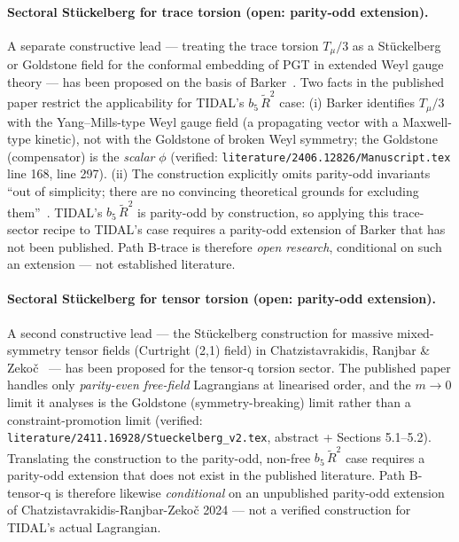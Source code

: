 \paragraph{Sectoral Stückelberg for trace torsion (open: parity-odd extension).}
A separate constructive lead --- treating the trace torsion
$T_\mu/3$ as a Stückelberg or Goldstone field for the conformal embedding
of PGT in extended Weyl gauge theory --- has been proposed on the basis
of Barker~\cite{barker2024poincare}.  Two facts in the published paper
restrict the applicability for TIDAL's $b_5\,\tilde{R}^2$ case:
(i) Barker identifies $T_\mu/3$ with the Yang--Mills-type Weyl gauge
field (a propagating vector with a Maxwell-type kinetic), not with the
Goldstone of broken Weyl symmetry; the Goldstone (compensator) is the
\emph{scalar} $\phi$ (verified: \texttt{literature/2406.12826/Manuscript.tex}
line 168, line 297).  (ii) The construction explicitly omits parity-odd
invariants ``out of simplicity; there are no convincing theoretical
grounds for excluding them''~\cite[footnote at line 109]{barker2024poincare}.
TIDAL's $b_5\,\tilde{R}^2$ is parity-odd by construction, so applying
this trace-sector recipe to TIDAL's case requires a parity-odd extension
of Barker that has not been published.  Path B-trace is therefore
\emph{open research}, conditional on such an extension --- not
established literature.

\paragraph{Sectoral Stückelberg for tensor torsion (open: parity-odd extension).}
A second constructive lead --- the Stückelberg construction for massive
mixed-symmetry tensor fields (Curtright (2,1) field) in
Chatzistavrakidis, Ranjbar \& Zekoč~\cite{ChatzistavrakidisRanjbarZekoc2024}
--- has been proposed for the tensor-q torsion sector.  The published
paper handles only \emph{parity-even free-field} Lagrangians at
linearised order, and the $m \to 0$ limit it analyses is the Goldstone
(symmetry-breaking) limit rather than a constraint-promotion limit
(verified: \texttt{literature/2411.16928/Stueckelberg\_v2.tex}, abstract
+ Sections 5.1--5.2).  Translating the construction to the parity-odd,
non-free $b_5\,\tilde{R}^2$ case requires a parity-odd extension that
does not exist in the published literature.  Path B-tensor-q is
therefore likewise \emph{conditional} on an unpublished parity-odd
extension of Chatzistavrakidis-Ranjbar-Zekoč 2024 --- not a verified
construction for TIDAL's actual Lagrangian.

